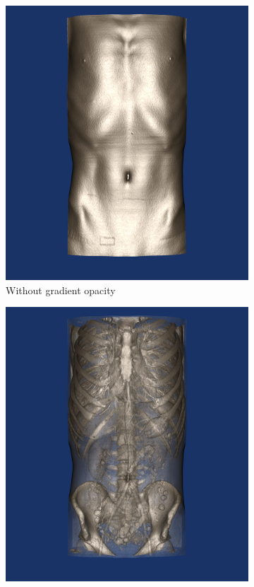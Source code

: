 \begin{figure}[htb]
  \centering
   \begin{subfigure}[b]{0.5\columnwidth}
     \includegraphics[width=\columnwidth]{TorsoNoGradient}
     \caption{Without gradient opacity}
     \label{fig:Ng1}
   \end{subfigure}%
  \begin{subfigure}[b]{0.5\columnwidth}
    \includegraphics[width=\columnwidth]{TorsoGradient}

\end{subfigure}
\end{figure}
